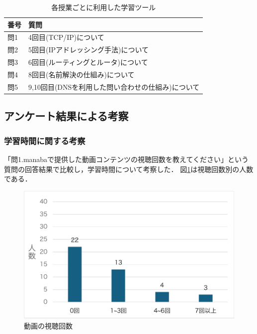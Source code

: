 \documentclass[12pt,a4j,titlepage]{ltjsarticle}
\begin{document}
\begin{table}[htbp]
  \caption{各授業ごとに利用した学習ツール}
  \begin{center}
\begin{tabular}{ll}\hline
               番号 & 質問 \\ \hline
               問1 & 4回目(TCP/IP)について\\
               問2 & 5回目(IPアドレッシング手法)について\\
               問3 & 6回目(ルーティングとルータ)について\\
               問4 & 8回目(名前解決の仕組み)について\\
               問5 & 9,10回目(DNSを利用した問い合わせの仕組み)について\\
              \hline
               \end{tabular}
               \end{center}
               \label{tb:anke2_3}
               \end{table}

\clearpage

\subsection{アンケート結果による考察}

\subsubsection{学習時間に関する考察}
「問1.manabaで提供した動画コンテンツの視聴回数を教えてください」という質問の回答結果で比較し，学習時間について考察した．
図\ref{fig:sityou}は視聴回数別の人数である．

\begin{figure}[!htb]
  \centering
  \includegraphics[width=15cm]{動画の視聴回数.pdf}
  \caption{動画の視聴回数}
  \label{fig:sityou}
\end{figure}
\end{document}
